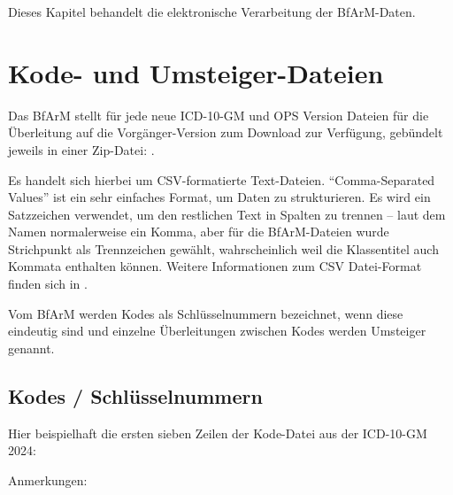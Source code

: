 Dieses Kapitel behandelt die elektronische Verarbeitung der BfArM-Daten. %

\section{Kode- und Umsteiger-Dateien}

Das BfArM stellt für jede neue ICD-10-GM und OPS Version Dateien für die Überleitung auf die Vorgänger-Version zum Download zur Verfügung, gebündelt jeweils in einer Zip-Datei: \cite[Downloads]{bfarmdl}.

Es handelt sich hierbei um CSV-formatierte Text-Dateien. %
"`Comma-Separated Values"' ist ein sehr einfaches Format,
um Daten zu strukturieren. Es wird ein Satzzeichen verwendet, um den restlichen Text in Spalten zu trennen -- laut dem Namen normalerweise ein Komma, aber für die BfArM-Dateien wurde Strichpunkt als Trennzeichen gewählt, wahrscheinlich weil die Klassentitel auch Kommata enthalten können. Weitere Informationen zum CSV Datei-Format finden sich in \cite[Seite 131f]{bonnefoy2024definitive}. 

Vom BfArM werden Kodes als Schlüsselnummern bezeichnet, wenn diese eindeutig sind und einzelne Überleitungen zwischen Kodes werden Umsteiger genannt.

\subsection{Kodes / Schlüsselnummern}

Hier beispielhaft die ersten sieben Zeilen der Kode-Datei aus der ICD-10-GM 2024:


\newpage

Anmerkungen: 

